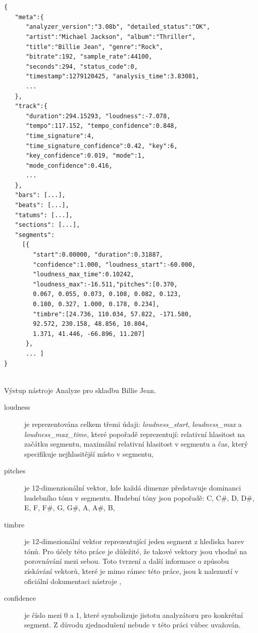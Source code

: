 \documentclass[thesis=M,czech]{FITthesis}[2012/06/26]
\begin{document}
\begin{listing}
\begin{verbatim}


{  
   "meta":{  
      "analyzer_version":"3.08b", "detailed_status":"OK",
      "artist":"Michael Jackson", "album":"Thriller",
      "title":"Billie Jean", "genre":"Rock",
      "bitrate":192, "sample_rate":44100,
      "seconds":294, "status_code":0,
      "timestamp":1279120425, "analysis_time":3.83081,
      ...
   },
   "track":{  
      "duration":294.15293, "loudness":-7.078,
      "tempo":117.152, "tempo_confidence":0.848,
      "time_signature":4,
      "time_signature_confidence":0.42, "key":6,
      "key_confidence":0.019, "mode":1,
      "mode_confidence":0.416,
      ...
   },
   "bars": [...],
   "beats": [...],
   "tatums": [...],
   "sections": [...],
   "segments":
     [{ 
        "start":0.00000, "duration":0.31887,
        "confidence":1.000, "loudness_start":-60.000,
        "loudness_max_time":0.10242,
        "loudness_max":-16.511,"pitches":[0.370,
        0.067, 0.055, 0.073, 0.108, 0.082, 0.123,
        0.180, 0.327, 1.000, 0.178, 0.234],
        "timbre":[24.736, 110.034, 57.822, -171.580,
        92.572, 230.158, 48.856, 10.804,
        1.371, 41.446, -66.896, 11.207]
      },
      ... ]
}


\end{verbatim}
\caption{Výstup nástroje Analyze pro skladbu Billie Jean.} 
\label{json-example}
\end{listing}

\begin{description}
\item[loudness]

je reprezentována celkem třemi údaji: \textit{loudness\_start}, \textit{loudness\_max} a \textit{loudness\_max\_time}, které popořadě reprezentují: relativní hlasitost na začátku segmentu, maximální relativní hlasitost v segmentu a čas, který specifikuje nejhlasitější místo v segmentu,
 
\item[pitches] je 12-dimenzionální vektor, kde každá dimenze představuje dominanci hudebního tónu v segmentu. Hudební tóny jsou popořadě: C, C\#, D, D\#, E, F, F\#, G, G\#, A, A\#, B,

\item[timbre] je 12-dimezionální vektor reprezentující jeden segment z hlediska barev tónů. Pro účely této práce je důležité, že takové vektory jsou vhodné na porovnávání mezi sebou. Toto tvrzení a další informace o způsobu získávání vektorů, které je mimo rámec této práce, jsou k naleznutí v oficiální dokumentaci nástroje \cite{analyze},

\item[confidence] je číslo mezi 0 a 1, které symbolizuje jistotu analyzátoru pro konkrétní segment. Z důvodu zjednodušení nebude v této práci vůbec uvažován.
\end{description}
\end{document}
